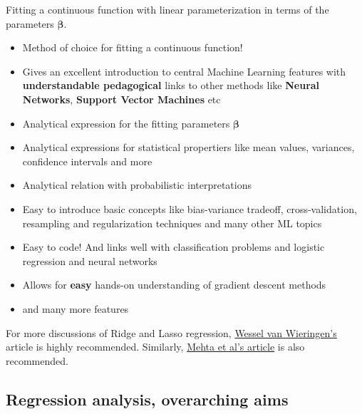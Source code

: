 \documentclass[%
oneside,                 %
final,                   %
10pt]{article}
\begin{document}
Fitting a continuous function with linear parameterization in terms of the parameters  $\bm{\beta}$.
\begin{itemize}
\item Method of choice for fitting a continuous function!

\item Gives an excellent introduction to central Machine Learning features with \textbf{understandable pedagogical} links to other methods like \textbf{Neural Networks}, \textbf{Support Vector Machines} etc

\item Analytical expression for the fitting parameters $\bm{\beta}$

\item Analytical expressions for statistical propertiers like mean values, variances, confidence intervals and more

\item Analytical relation with probabilistic interpretations 

\item Easy to introduce basic concepts like bias-variance tradeoff, cross-validation, resampling and regularization techniques and many other ML topics

\item Easy to code! And links well with classification problems and logistic regression and neural networks

\item Allows for \textbf{easy} hands-on understanding of gradient descent methods

\item and many more features
\end{itemize}

\noindent
For more discussions of Ridge and Lasso regression, \href{{https://arxiv.org/abs/1509.09169}}{Wessel van Wieringen's} article is highly recommended.
Similarly, \href{{https://arxiv.org/abs/1803.08823}}{Mehta et al's article} is also recommended.


\subsection{Regression analysis, overarching aims}

\paragraph{}
\end{document}
